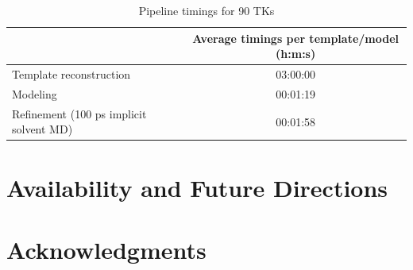 \documentclass[aps,pre,twocolumn,nofootinbib,superscriptaddress,linenumbers]{revtex4-1}
\begin{document}
\begin{table}
\begin{tabular}{l|c}

    & Average timings per template/model (h:m:s) \\
    \hline
    Template reconstruction & 03:00:00 \\
    Modeling & 00:01:19 \\
    Refinement (100 ps implicit solvent MD) & 00:01:58 \\

\end{tabular}
\label{tab:timings}
\caption{Pipeline timings for 90 TKs}
\end{table}

\section{Availability and Future Directions}
\label{section:availability}

\section{Acknowledgments}
\label{section:acknowledgments}


% 

\end{document}
